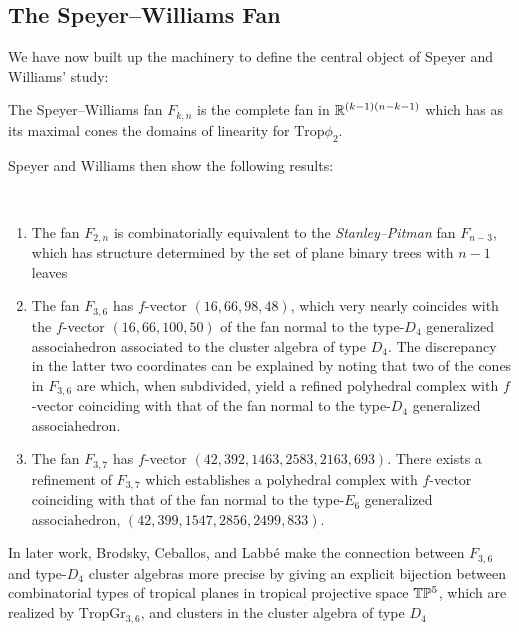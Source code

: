 \documentclass[12pt,letter]{article}
\newcommand{\gr}{\mathrm{Gr}}
\newcommand{\trop}{\mathrm{Trop}}
\begin{document}
  \subsection{The Speyer--Williams Fan} We have now built up the machinery to define the central object of Speyer and Williams' study:
  \begin{definition}
  	The Speyer--Williams fan $F_{k,n}$ is the complete fan in ${\mathbb R}^{(k-1)(n-k-1)}$ which has as its maximal cones the domains of linearity for $\trop\phi_2$. 
  \end{definition}
Speyer and Williams then show the following results:
\begin{theorem}~
\begin{enumerate}
	\item The fan $F_{2,n}$ is combinatorially equivalent to the \emph{Stanley--Pitman} fan $F_{n-3}$, which has structure determined by the set of plane binary trees with $n-1$ leaves
	\item The fan $F_{3,6}$ has $f$-vector $(16, 66, 98, 48)$, which very nearly coincides with the $f$-vector $(16,66,100,50)$ of the fan normal to the type-$D_4$ generalized associahedron associated to the cluster algebra of type $D_4$. The discrepancy in the latter two coordinates can be explained by noting that two of the cones in $F_{3,6}$ are  which, when subdivided, yield a refined polyhedral complex with $f$-vector coinciding with that of the fan normal to the type-$D_4$ generalized associahedron.
	\item The fan $F_{3,7}$ has $f$-vector $(42, 392, 1463, 2583, 2163, 693)$. There exists a refinement of $F_{3,7}$ which establishes a polyhedral complex with $f$-vector coinciding with that of the fan normal to the type-$E_6$ generalized associahedron, $(42, 399, 1547, 2856, 2499, 833)$.
\end{enumerate}
\end{theorem}
 
In later work, Brodsky, Ceballos, and Labb\'e \cite{BCL16} make the connection between $F_{3,6}$ and type-$D_4$ cluster algebras more precise by giving an explicit bijection between combinatorial types of tropical planes in tropical projective space ${\mathbb T}{\mathbb P}^5$, which are realized by $\trop\gr_{3,6}$, and clusters in the cluster algebra of type $D_4$ 
  
\begin{example}
\end{example}


\nocite{*}
\printbibliography
\end{document}
